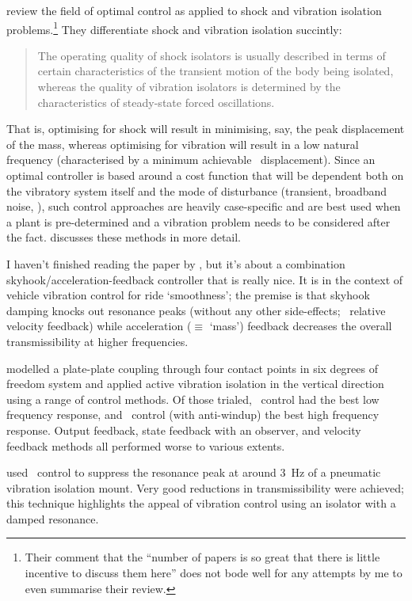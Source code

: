 \textcite{balandin1998} review the field of optimal control as applied
to shock and vibration isolation problems.\footnote{Their comment that the
  \enquote{number of papers is so great that there is little incentive to
  discuss them here} does not bode well for any attempts by me to
  even summarise their review.} 
  They differentiate shock and vibration isolation succintly:
\begin{quote}
  The operating quality of shock isolators is usually described in
  terms of certain characteristics of the transient motion of the body
  being isolated, whereas the quality of vibration isolators is
  determined by the characteristics of steady-state forced
  oscillations.
\end{quote}
That is, optimising for shock will result in minimising, say, the peak
displacement of the mass, whereas optimising for vibration will result
in a low natural frequency (characterised by a minimum achievable
\RMS\ displacement). Since an optimal controller is based around a
cost function that will be dependent both on the vibratory system
itself and the mode of disturbance (transient, broadband noise, \etc),
such control approaches are heavily case-specific and are best used
when a plant is pre-determined and a vibration problem needs to be
considered after the fact. \textcite{bolotnik2001} discusses these
methods in more detail.

I haven't finished reading the paper by \textcite{savaresi2007}, but
it's about a combination skyhook/acceleration-feedback controller that
is really nice. It is in the context of vehicle vibration control for
ride `smoothness'; the premise is that skyhook damping knocks out
resonance peaks (without any other side-effects; \cf\ relative
velocity feedback) while acceleration ($\equiv$ `mass') feedback
decreases the overall transmissibility at higher frequencies.



\textcite{kerber2007} modelled a plate-plate coupling through four
contact points in six degrees of freedom system and applied active
vibration isolation in the vertical direction using a range of control
methods. Of those trialed, \Hinf\ control had the best low frequency
response, and \PI\ control (with anti-windup) the best high
frequency response. Output feedback, state feedback with an observer,
and velocity feedback methods all performed worse to various extents.

\textcite{chen2007} used \Hinf\ control to suppress the resonance peak at
around \SI{3}{Hz} of a pneumatic vibration isolation mount. Very good
reductions in transmissibility were achieved; this technique highlights the
appeal of vibration control using an isolator with a damped resonance.

